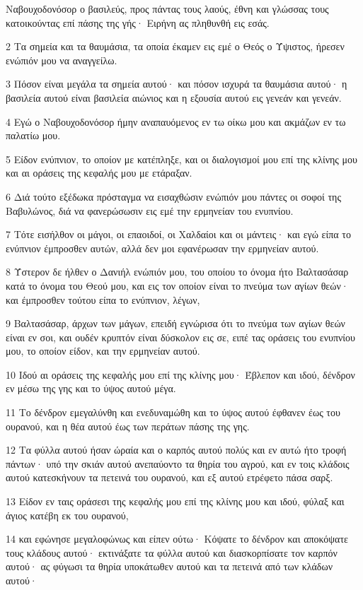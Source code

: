 \par Ναβουχοδονόσορ ο βασιλεύς, προς πάντας τους λαούς, έθνη και γλώσσας τους κατοικούντας επί πάσης της γής· Ειρήνη ας πληθυνθή εις εσάς.
\par 2 Τα σημεία και τα θαυμάσια, τα οποία έκαμεν εις εμέ ο Θεός ο Ύψιστος, ήρεσεν ενώπιόν μου να αναγγείλω.
\par 3 Πόσον είναι μεγάλα τα σημεία αυτού· και πόσον ισχυρά τα θαυμάσια αυτού· η βασιλεία αυτού είναι βασιλεία αιώνιος και η εξουσία αυτού εις γενεάν και γενεάν.
\par 4 Εγώ ο Ναβουχοδονόσορ ήμην αναπαυόμενος εν τω οίκω μου και ακμάζων εν τω παλατίω μου.
\par 5 Είδον ενύπνιον, το οποίον με κατέπληξε, και οι διαλογισμοί μου επί της κλίνης μου και αι οράσεις της κεφαλής μου με ετάραξαν.
\par 6 Διά τούτο εξέδωκα πρόσταγμα να εισαχθώσιν ενώπιόν μου πάντες οι σοφοί της Βαβυλώνος, διά να φανερώσωσιν εις εμέ την ερμηνείαν του ενυπνίου.
\par 7 Τότε εισήλθον οι μάγοι, οι επαοιδοί, οι Χαλδαίοι και οι μάντεις· και εγώ είπα το ενύπνιον έμπροσθεν αυτών, αλλά δεν μοι εφανέρωσαν την ερμηνείαν αυτού.
\par 8 Ύστερον δε ήλθεν ο Δανιήλ ενώπιόν μου, του οποίου το όνομα ήτο Βαλτασάσαρ κατά το όνομα του Θεού μου, και εις τον οποίον είναι το πνεύμα των αγίων θεών· και έμπροσθεν τούτου είπα το ενύπνιον, λέγων,
\par 9 Βαλτασάσαρ, άρχων των μάγων, επειδή εγνώρισα ότι το πνεύμα των αγίων θεών είναι εν σοι, και ουδέν κρυπτόν είναι δύσκολον εις σε, ειπέ τας οράσεις του ενυπνίου μου, το οποίον είδον, και την ερμηνείαν αυτού.
\par 10 Ιδού αι οράσεις της κεφαλής μου επί της κλίνης μου· Έβλεπον και ιδού, δένδρον εν μέσω της γης και το ύψος αυτού μέγα.
\par 11 Το δένδρον εμεγαλύνθη και ενεδυναμώθη και το ύψος αυτού έφθανεν έως του ουρανού, και η θέα αυτού έως των περάτων πάσης της γης.
\par 12 Τα φύλλα αυτού ήσαν ώραία και ο καρπός αυτού πολύς και εν αυτώ ήτο τροφή πάντων· υπό την σκιάν αυτού ανεπαύοντο τα θηρία του αγρού, και εν τοις κλάδοις αυτού κατεσκήνουν τα πετεινά του ουρανού, και εξ αυτού ετρέφετο πάσα σαρξ.
\par 13 Είδον εν ταις οράσεσι της κεφαλής μου επί της κλίνης μου και ιδού, φύλαξ και άγιος κατέβη εκ του ουρανού,
\par 14 και εφώνησε μεγαλοφώνως και είπεν ούτω· Κόψατε το δένδρον και αποκόψατε τους κλάδους αυτού· εκτινάξατε τα φύλλα αυτού και διασκορπίσατε τον καρπόν αυτού· ας φύγωσι τα θηρία υποκάτωθεν αυτού και τα πετεινά από των κλάδων αυτού·
